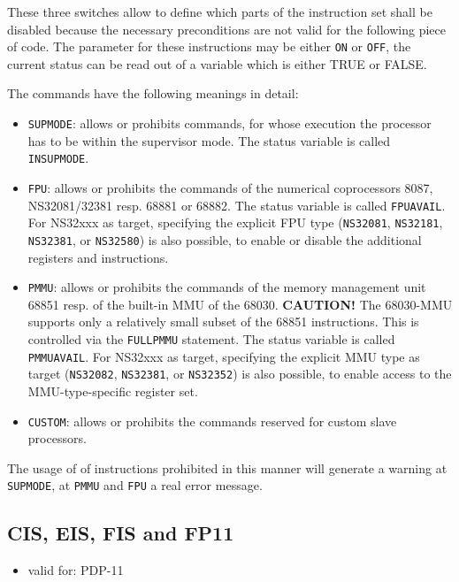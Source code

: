 \documentclass[12pt,twoside]{report}
\makeatletter
\newcommand{\bb}[1]{{\bf #1}}
\newcommand{\tty}[1]{{\tt #1}}
\newcommand{\ttindex}[1]{\index{#1@{\tt #1}}}
\makeatother
\begin{document}
These three switches allow to define which parts of the instruction set
shall be disabled because the necessary preconditions are not valid for
the following piece of code.  The parameter for these instructions may be
either \tty{ON} or \tty{OFF}, the current status can be read out of a
variable which is either TRUE or FALSE.

The commands have the following meanings in detail:
\begin{itemize}
\item{\tty{SUPMODE}: allows or prohibits commands, for whose execution the
      processor has to be within the supervisor mode.  The status
      variable is called \tty{INSUPMODE}.}
\item{\tty{FPU}: allows or prohibits the commands of the numerical
      coprocessors 8087, NS32081/32381 resp. 68881 or 68882.  The status
      variable is called \tty{FPUAVAIL}.  For NS32xxx as target, specifying
      the explicit FPU type (\tty{NS32081}, \tty{NS32181}, \tty{NS32381},
      or \tty{NS32580}) is also possible, to enable or disable the additional
      registers and instructions.}
\item{\tty{PMMU}: allows or prohibits the commands of the memory
      management unit 68851 resp. of  the built-in MMU of the 68030.
      \bb{CAUTION!} The 68030-MMU supports only a relatively small subset
      of the 68851 instructions.  This is controlled via the \tty{FULLPMMU}
      statement. The status variable is called \tty{PMMUAVAIL}. For NS32xxx
      as target, specifying the explicit MMU type as target (\tty{NS32082},
      \tty{NS32381}, or \tty{NS32352}) is also possible, to enable access to
      the MMU-type-specific register set.}
\item{\tty{CUSTOM}: allows or prohibits the commands reserved for custom
      slave processors.}
\end{itemize}
The usage of of instructions prohibited in this manner will generate a
warning at \tty{SUPMODE}, at \tty{PMMU} and \tty{FPU} a real error
message.


\subsection{CIS, EIS, FIS and FP11}
\ttindex{CIS}\ttindex{EIS}\ttindex{FIS}\ttindex{FP11}

{\em
\begin{itemize}
\item{valid for: PDP-11}
\end{itemize}
}
\end{document}
